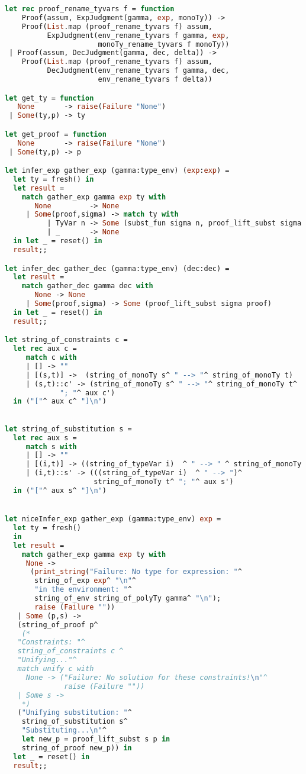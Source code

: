 \begin{lstlisting}[language=Caml, caption=definitions.ml]
let rec proof_rename_tyvars f = function
    Proof(assum, ExpJudgment(gamma, exp, monoTy)) ->
    Proof(List.map (proof_rename_tyvars f) assum,
          ExpJudgment(env_rename_tyvars f gamma, exp,
                      monoTy_rename_tyvars f monoTy))
 | Proof(assum, DecJudgment(gamma, dec, delta)) ->
    Proof(List.map (proof_rename_tyvars f) assum,
          DecJudgment(env_rename_tyvars f gamma, dec,
                      env_rename_tyvars f delta))

let get_ty = function
   None       -> raise(Failure "None")
 | Some(ty,p) -> ty

let get_proof = function
   None       -> raise(Failure "None")
 | Some(ty,p) -> p

let infer_exp gather_exp (gamma:type_env) (exp:exp) = 
  let ty = fresh() in
  let result = 
    match gather_exp gamma exp ty with
       None         -> None
     | Some(proof,sigma) -> match ty with
          | TyVar n -> Some (subst_fun sigma n, proof_lift_subst sigma proof)
          | _       -> None
  in let _ = reset() in
  result;;

let infer_dec gather_dec (gamma:type_env) (dec:dec) =
  let result = 
    match gather_dec gamma dec with
       None -> None
     | Some(proof,sigma) -> Some (proof_lift_subst sigma proof)
  in let _ = reset() in
  result;;

let string_of_constraints c =
  let rec aux c =
     match c with 
     | [] -> ""
     | [(s,t)] ->  (string_of_monoTy s^ " --> "^ string_of_monoTy t)
     | (s,t)::c' -> (string_of_monoTy s^ " --> "^ string_of_monoTy t^
		     "; "^ aux c')
  in ("["^ aux c^ "]\n")

 
let string_of_substitution s =
  let rec aux s =
     match s with 
     | [] -> ""
     | [(i,t)] -> ((string_of_typeVar i)  ^ " --> " ^ string_of_monoTy t)
     | (i,t)::s' -> (((string_of_typeVar i)  ^ " --> ")^
                     string_of_monoTy t^ "; "^ aux s')
  in ("["^ aux s^ "]\n")


let niceInfer_exp gather_exp (gamma:type_env) exp = 
  let ty = fresh()
  in
  let result = 
    match gather_exp gamma exp ty with
     None ->
      (print_string("Failure: No type for expression: "^
       string_of_exp exp^ "\n"^
       "in the environment: "^
       string_of_env string_of_polyTy gamma^ "\n");
       raise (Failure ""))
   | Some (p,s) ->
   (string_of_proof p^
	(*
   "Constraints: "^
   string_of_constraints c ^
   "Unifying..."^
   match unify c with
     None -> ("Failure: No solution for these constraints!\n"^
              raise (Failure ""))
   | Some s ->
	*)
   ("Unifying substitution: "^
    string_of_substitution s^
    "Substituting...\n"^
    let new_p = proof_lift_subst s p in
    string_of_proof new_p)) in
  let _ = reset() in
  result;;


\end{lstlisting}
